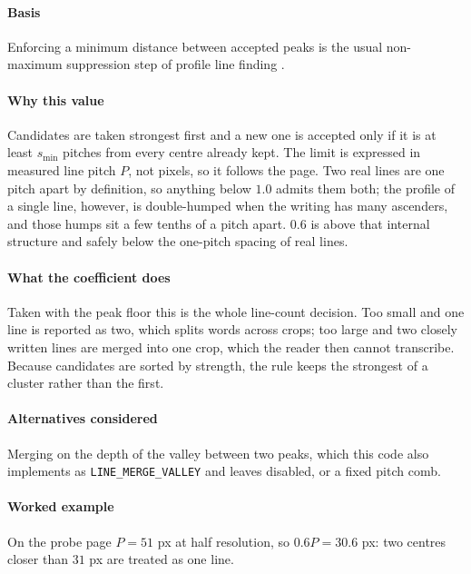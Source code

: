 \paragraph{Basis}

Enforcing a minimum distance between accepted peaks is the usual non-maximum suppression step of profile line finding \cite{likforman2007}.

\paragraph{Why this value}

Candidates are taken strongest first and a new one is accepted only if it is at least $s_{\min}$ pitches from every centre already kept. The limit is expressed in measured line pitch $P$, not pixels, so it follows the page. Two real lines are one pitch apart by definition, so anything below $1.0$ admits them both; the profile of a single line, however, is double-humped when the writing has many ascenders, and those humps sit a few tenths of a pitch apart. $0.6$ is above that internal structure and safely below the one-pitch spacing of real lines.

\paragraph{What the coefficient does}

Taken with the peak floor this is the whole line-count decision. Too small and one line is reported as two, which splits words across crops; too large and two closely written lines are merged into one crop, which the reader then cannot transcribe. Because candidates are sorted by strength, the rule keeps the strongest of a cluster rather than the first.

\paragraph{Alternatives considered}

Merging on the depth of the valley between two peaks, which this code also implements as \texttt{LINE\_MERGE\_VALLEY} and leaves disabled, or a fixed pitch comb.

\paragraph{Worked example}

On the probe page $P = 51$ px at half resolution, so $0.6P = 30.6$ px: two centres closer than $31$ px are treated as one line.

